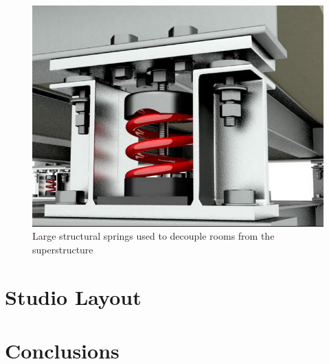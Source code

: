 \documentclass[10pt, twocolumn]{article}
\begin{document}
            \begin{figure}[H]
                \centering
                \includegraphics[scale = 0.5]{resources/springs.png}
                \caption{Large structural springs used to decouple rooms from the superstructure}
                \label{springs}
            \end{figure}

    \section{Studio Layout}

    


    \section{Conclusions}

    
    
\end{document}
